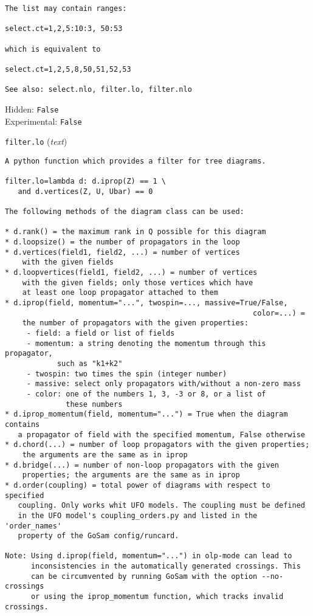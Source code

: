 \begin{basedescript}{\desclabelstyle{\pushlabel}}
\begin{verbatim}
The list may contain ranges:

select.ct=1,2,5:10:3, 50:53

which is equivalent to

select.ct=1,2,5,8,50,51,52,53

See also: select.nlo, filter.lo, filter.nlo
\end{verbatim}
Hidden: \verb|False|
\\Experimental: \verb|False|
\\\item[\colorbox{gray!30}{\texttt{filter.lo}}] (\textit{text})
\begin{verbatim}
A python function which provides a filter for tree diagrams.

filter.lo=lambda d: d.iprop(Z) == 1 \
   and d.vertices(Z, U, Ubar) == 0

The following methods of the diagram class can be used:

* d.rank() = the maximum rank in Q possible for this diagram
* d.loopsize() = the number of propagators in the loop
* d.vertices(field1, field2, ...) = number of vertices
    with the given fields
* d.loopvertices(field1, field2, ...) = number of vertices
    with the given fields; only those vertices which have
    at least one loop propagator attached to them
* d.iprop(field, momentum="...", twospin=..., massive=True/False,
                                                         color=...) =
    the number of propagators with the given properties:
     - field: a field or list of fields
     - momentum: a string denoting the momentum through this propagator,
            such as "k1+k2"
     - twospin: two times the spin (integer number)
     - massive: select only propagators with/without a non-zero mass
     - color: one of the numbers 1, 3, -3 or 8, or a list of
              these numbers
* d.iprop_momentum(field, momentum="...") = True when the diagram contains
   a propagator of field with the specified momentum, False otherwise
* d.chord(...) = number of loop propagators with the given properties;
    the arguments are the same as in iprop
* d.bridge(...) = number of non-loop propagators with the given
    properties; the arguments are the same as in iprop
* d.order(coupling) = total power of diagrams with respect to specified
   coupling. Only works whit UFO models. The coupling must be defined
   in the UFO model's coupling_orders.py and listed in the 'order_names'
   property of the GoSam config/runcard.

Note: Using d.iprop(field, momentum="...") in olp-mode can lead to
      inconsistencies in the automatically generated crossings. This
      can be circumvented by running GoSam with the option --no-crossings
      or using the iprop_momentum function, which tracks invalid crossings.


\end{verbatim}
\end{basedescript}
